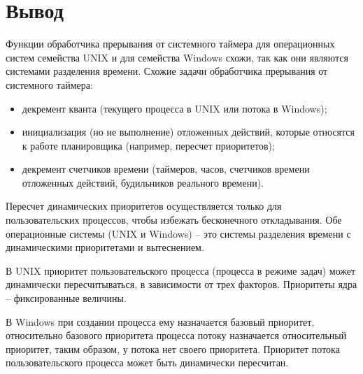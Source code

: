 \section{Вывод}
Функции обработчика прерывания от системного таймера для операционных систем семейства UNIX и для семейства Windows схожи, так как они являются системами разделения времени. Схожие задачи обработчика прерывания от системного таймера:
\begin{itemize}[label*=---]
	\item декремент кванта (текущего процесса в UNIX или потока в Windows);
	\item инициализация (но не выполнение) отложенных действий, которые относятся к работе планировщика (например, пересчет приоритетов);
	\item декремент счетчиков времени (таймеров, часов, счетчиков времени отложенных действий, будильников реального времени).
\end{itemize}

Пересчет динамических приоритетов осуществляется только для пользовательских процессов, чтобы избежать бесконечного откладывания.  Обе операционные системы (UNIX и Windows) -- это системы разделения времени с динамическими приоритетами и вытеснением.

В UNIX приоритет пользовательского процесса (процесса в режиме задач) может динамически пересчитываться, в зависимости от трех факторов. Приоритеты ядра – фиксированные величины.

В Windows при создании процесса ему назначается базовый приоритет, относительно базового приоритета процесса потоку назначается относительный приоритет, таким образом, у потока нет своего приоритета. Приоритет потока пользовательского процесса может быть динамически
пересчитан.